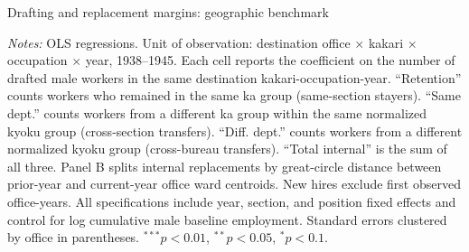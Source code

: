 \begin{frame}[t]{Drafting and replacement margins: geographic benchmark}
\begin{threeparttable}
\begin{tablenotes}[flushleft]
        \tiny
        \item \textit{Notes:} OLS regressions. Unit of observation: destination office $\times$ kakari $\times$ occupation $\times$ year, 1938--1945. Each cell reports the coefficient on the number of drafted male workers in the same destination kakari-occupation-year. ``Retention'' counts workers who remained in the same ka group (same-section stayers). ``Same dept.'' counts workers from a different ka group within the same normalized kyoku group (cross-section transfers). ``Diff. dept.'' counts workers from a different normalized kyoku group (cross-bureau transfers). ``Total internal'' is the sum of all three. Panel B splits internal replacements by great-circle distance between prior-year and current-year office ward centroids. New hires exclude first observed office-years. All specifications include year, section, and position fixed effects and control for log cumulative male baseline employment. Standard errors clustered by office in parentheses. $^{***}p<0.01$, $^{**}p<0.05$, $^{*}p<0.1$.
    \end{tablenotes}
    \end{threeparttable}
\end{frame}
